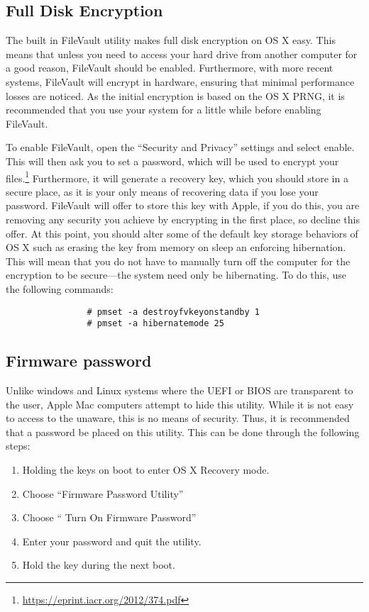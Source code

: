 		\subsection{Full Disk Encryption}
			The built in FileVault utility makes full disk encryption on OS X easy.
			This means that unless you need to access your hard drive from another computer for a good reason, FileVault should be enabled.
			Furthermore, with more recent systems, FileVault will encrypt in hardware, ensuring that minimal performance losses are noticed.
			As the initial encryption is based on the OS X PRNG, it is recommended that you use your system for a little while before enabling FileVault.

			To enable FileVault, open the ``Security and Privacy'' settings and select enable.
			This will then ask you to set a password, which will be used to encrypt your files.\footnote{\url{https://eprint.iacr.org/2012/374.pdf}}
			Furthermore, it will generate a recovery key, which you should store in a secure place, as it is your only means of recovering data if you lose your password.
			FileVault will offer to store this key with Apple, if you do this, you are removing any security you achieve by encrypting in the first place, so decline this offer.
			At this point, you should alter some of the default key storage behaviors of OS X such as erasing the key from memory on sleep an enforcing hibernation.
			This will mean that you do not have to manually turn off the computer for the encryption to be secure---the system need only be hibernating.
			To do this, use the following commands:
			\begin{verbatim}
				# pmset -a destroyfvkeyonstandby 1
				# pmset -a hibernatemode 25
			\end{verbatim}
		\subsection{Firmware password}
			Unlike windows and Linux systems where the UEFI or BIOS are transparent to the user, Apple Mac computers attempt to hide this utility.
			While it is not easy to access to the unaware, this is no means of security.
			Thus, it is recommended that a password be placed on this utility.
			This can be done through the following steps:
			\begin{enumerate}
				\item Holding the keys  on boot to enter OS X Recovery mode.
				\item Choose ``Firmware Password Utility''
				\item Choose `` Turn On Firmware Password''
				\item Enter your password and quit the utility.
				\item Hold the \Alt{} key during the next boot.
			\end{enumerate}
